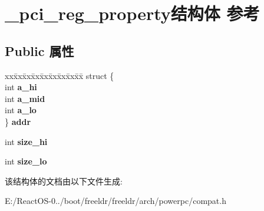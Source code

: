 \hypertarget{struct__pci__reg__property}{}\section{\+\_\+pci\+\_\+reg\+\_\+property结构体 参考}
\label{struct__pci__reg__property}
\subsection*{Public 属性}
\begin{DoxyCompactItemize}
\item 
\mbox{\label{struct__pci__reg__property_a28525e57c78744fd12674c0c63ef9dc3}} 
\begin{tabbing}
xx\=xx\=xx\=xx\=xx\=xx\=xx\=xx\=xx\=\kill
struct \{\\
\>int {\bfseries a\_hi}\\
\>int {\bfseries a\_mid}\\
\>int {\bfseries a\_lo}\\
\} {\bfseries addr}\\

\end{tabbing}\item 
\mbox{\label{struct__pci__reg__property_adaaa9e14632ae88f5181a6003fed8ff2}} 
int {\bfseries size\+\_\+hi}
\item 
\mbox{\label{struct__pci__reg__property_ab11a644777ae532608a35f4fe92c7a88}} 
int {\bfseries size\+\_\+lo}
\end{DoxyCompactItemize}


该结构体的文档由以下文件生成\+:\begin{DoxyCompactItemize}
\item 
E\+:/\+React\+O\+S-\/0../boot/freeldr/freeldr/arch/powerpc/compat.\+h\end{DoxyCompactItemize}
